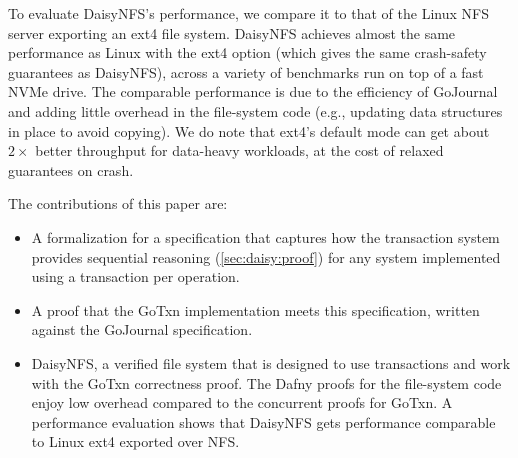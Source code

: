 
To evaluate DaisyNFS's performance, we compare it to that of the Linux NFS server
exporting an ext4 file system. DaisyNFS achieves almost the same performance as
Linux with the ext4  option (which gives the same crash-safety
guarantees as DaisyNFS), across a variety of benchmarks run on top of a fast NVMe
drive. The comparable performance is due to the efficiency of GoJournal and
adding little overhead in the file-system code (e.g., updating data structures
in place to avoid copying). We do note that ext4's default 
mode can get about $2\times$ better throughput for data-heavy workloads, at the
cost of relaxed guarantees on crash.

The contributions of this paper are: 
\begin{itemize}
  \item A formalization for a specification that captures how the transaction
  system provides sequential reasoning (\cref{sec:daisy:proof}) for any system
  implemented using a transaction per operation.
  \item A proof that the GoTxn implementation meets this specification, written
  against the GoJournal specification.
  \item DaisyNFS, a verified file system that is designed to use transactions
  and work with the GoTxn correctness proof. The Dafny proofs for the
  file-system code enjoy low overhead compared to the concurrent proofs for GoTxn. A performance
  evaluation shows that DaisyNFS gets performance comparable to Linux ext4
  exported over NFS.
\end{itemize}

